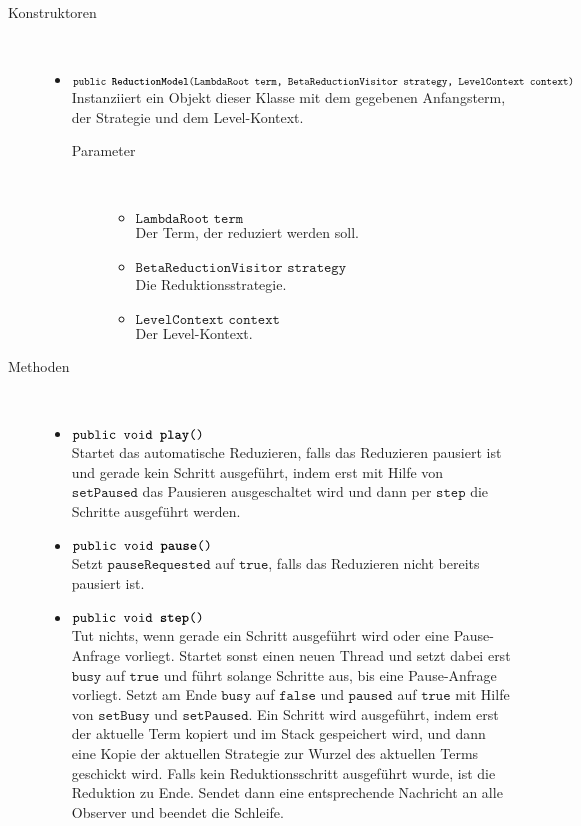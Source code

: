 \begin{description}
\item[Konstruktoren] \hfill \\
	\vspace{-.8cm}
	\begin{itemize}
		\item $\texttt{public \textbf{ReductionModel}(LambdaRoot term, BetaReductionVisitor strategy, LevelContext context)}$ \\ Instanziiert ein Objekt dieser Klasse mit dem gegebenen Anfangsterm, der Strategie und dem Level-Kontext.
		\begin{description}
			\item[Parameter] \hfill \\
			\vspace{-.8cm}
			\begin{itemize}
				\item $\texttt{LambdaRoot term}$ \\ Der Term, der reduziert werden soll.
				\item $\texttt{BetaReductionVisitor strategy}$ \\ Die Reduktionsstrategie.
				\item $\texttt{LevelContext context}$ \\ Der Level-Kontext.
			\end{itemize}
		\end{description}
	\end{itemize}
	
\item[Methoden] \hfill \\
	\vspace{-.8cm}
	\begin{itemize}
		\item $\texttt{public void \textbf{play}()}$ \\ Startet das automatische Reduzieren, falls das Reduzieren pausiert ist und gerade kein Schritt ausgeführt, indem erst mit Hilfe von $\texttt{setPaused}$ das Pausieren ausgeschaltet wird und dann per $\texttt{step}$ die Schritte ausgeführt werden.
		
		\item $\texttt{public void \textbf{pause}()}$ \\ Setzt $\texttt{pauseRequested}$ auf $\texttt{true}$, falls das Reduzieren nicht bereits pausiert ist.
		
		\item $\texttt{public void \textbf{step}()}$ \\ Tut nichts, wenn gerade ein Schritt ausgeführt wird oder eine Pause-Anfrage vorliegt. Startet sonst einen neuen Thread und setzt dabei erst $\texttt{busy}$ auf $\texttt{true}$ und führt solange Schritte aus, bis eine Pause-Anfrage vorliegt. Setzt am Ende $\texttt{busy}$ auf $\texttt{false}$ und $\texttt{paused}$ auf $\texttt{true}$ mit Hilfe von $\texttt{setBusy}$ und $\texttt{setPaused}$. Ein Schritt wird ausgeführt, indem erst der aktuelle Term kopiert und im Stack gespeichert wird, und dann eine Kopie der aktuellen Strategie zur Wurzel des aktuellen Terms geschickt wird. Falls kein Reduktionsschritt ausgeführt wurde, ist die Reduktion zu Ende. Sendet dann eine entsprechende Nachricht an alle Observer und beendet die Schleife.
		

\end{itemize}
\end{description}
